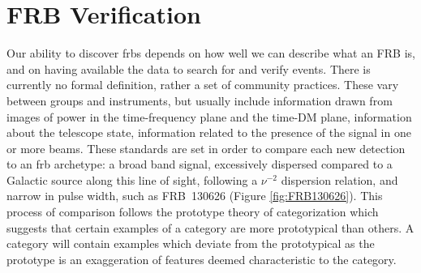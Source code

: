 \documentclass[a4paper,fleqn,usenatbib]{mnras}
\begin{document}
%


\section{FRB Verification}
\label{sec:verify_crit}

Our ability to discover \glspl{frb} depends on how well we can describe what an
FRB is, and on having available the data to search for and verify events. There
is currently no formal definition, rather a set of community practices. These
vary between groups and instruments, but usually include information drawn from
images of power in the time-frequency plane and the time-DM plane, information
about the telescope state, information related to the presence of the signal in
one or more beams.  These standards are set in order to compare each new
detection to an \gls{frb} archetype: a broad band signal, excessively dispersed compared
to a Galactic source along 
this line of sight, following a $\nu^{-2}$ dispersion relation, and
narrow in pulse width, such as FRB~130626 \citep{2016MNRAS.460L..30C} (Figure
\ref{fig:FRB130626}). This process of comparison follows the prototype theory of
categorization \citep{ROSCH1976382} which suggests that certain examples of a
category are more prototypical than others. A category will contain examples
which deviate from the prototypical as the prototype is an exaggeration of
features deemed characteristic to the category.
\end{document}

